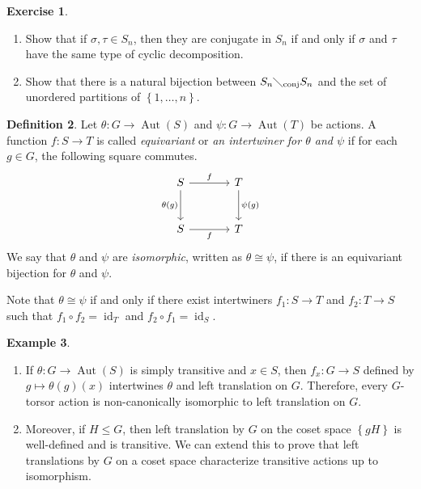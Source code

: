 \documentclass[10pt,letterpaper,cm]{nupset}
\theoremstyle{definition}
\newtheorem{definition}{Definition}[subsection]
\newtheorem{exmp}[definition]{Example}
\theoremstyle{theorem}
\newtheorem{exercise}[definition]{Exercise}
\theoremstyle{remark}
\newcommand{\1}{\mathbf{1}}
\newcommand{\0}{\vec 0}
\DeclareMathOperator{\id}{\mathrm{id}}
\DeclareMathOperator{\aut}{Aut}
\DeclareMathOperator{\conj}{conj}
\begin{document}
\begin{exercise} $ $
\begin{enumerate}

\item Show that if $\sigma, \tau \in S_n$, then they are conjugate in $S_n$  if and only if $\sigma$ and $\tau$ have the same type of cyclic decomposition.
\item Show that there is a natural bijection between ${S_n}\diagdown_{\conj}{S_n}$ and the set of unordered partitions of $\left\{1, \ldots, n\right\}$.
\end{enumerate}
\end{exercise}

\begin{definition}
Let $\theta : G \to \aut(S)$ and $\psi: G \to \aut(T)$ be actions. A function $f: S \to T$ is called \textit{equivariant} or \textit{an intertwiner for $\theta$ and $\psi$} if for each $g \in G$, the following square commutes.
\[
\begin{tikzcd}[row sep=large, column sep = large]
S \arrow[r, "f"] \arrow[d, "\theta(g)", swap]
& T \arrow[d, "\psi(g)"] \\
S \arrow[r, "f"']
& T
\end{tikzcd}
\]
We say that $\theta$ and $\psi$ are \textit{isomorphic}, written as $\theta \cong \psi$,  if there is an equivariant bijection for $\theta$ and $\psi$.
\end{definition}




Note that  $\theta \cong \psi$ if and only if there exist intertwiners $f_1 : S \to T$ and $f_2 : T \to S$ such that $f_1 \circ f_2 = \id_T$ and $f_2 \circ f_1 = \id_S$. 


\begin{exmp} $ $
\begin{enumerate}
\item If $\theta: G \to \aut(S)$ is simply transitive and $x \in S$, then $f_x: G \to S$ defined by $g \mapsto \theta(g)(x)$ intertwines $\theta$ and left translation on $G$. Therefore, every $G$-torsor action is non-canonically isomorphic to left translation on $G$.
\item Moreover, if $H \leq G$, then left translation by $G$ on the coset space $\left\{gH\right\}$ is well-defined and is transitive. We can extend this to prove that left translations by $G$ on a coset space characterize transitive actions up to isomorphism.
\end{enumerate}
\end{exmp}
\end{document}

